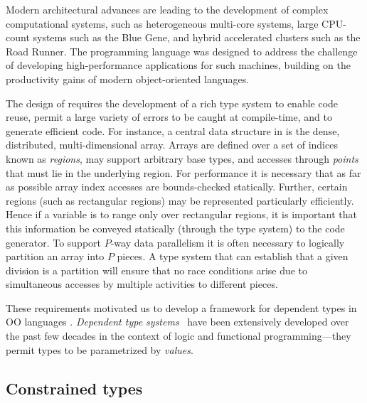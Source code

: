 

Modern architectural advances are leading to the development of
complex computational systems, such as heterogeneous multi-core
systems, large CPU-count systems such as the Blue Gene,
and hybrid accelerated clusters such as the Road Runner.
The \Xten{} programming language \cite{X10-concur,x10-oopsla05,X10} was
designed to address the challenge of developing
high-performance applications for such machines, building on the
productivity gains of modern object-oriented languages.

The design of \Xten{} requires the development of a rich type system
to enable code reuse, permit a large variety of errors to be caught at
compile-time, and to generate efficient code. For instance, a central
data structure in \Xten{} is the dense, distributed, multi-dimensional
array. Arrays are defined over a set of indices known as \emph{regions},
may support arbitrary base types, and accesses through {\em
points} that must lie in the underlying region. For performance it is
necessary that as far as possible array index accesses are
bounds-checked statically. Further, certain regions (such as
rectangular regions) may be represented particularly
efficiently. Hence if a variable is to range only over
rectangular regions, it is important that this information be conveyed
statically (through the type system) to the code 
generator. To support $P$-way data parallelism it is often necessary
to logically partition an array into $P$ pieces. A type system that
can establish that a given division is a partition will ensure that no
race conditions arise due to simultaneous accesses by
multiple activities to different pieces.

These requirements motivated us to develop a framework for dependent
types in OO languages \cite{constrained-types}.  \emph{Dependent type
systems}~\cite{dependent-types,xi99dependent,ocrz-ecoop03,aspinall-attapl,cayenne,epigram-matter,calc-constructions}
have been extensively developed over the past few decades in the
context of logic and functional programming---they permit types to be
parametrized by \emph{values}.

\subsection{Constrained types}


